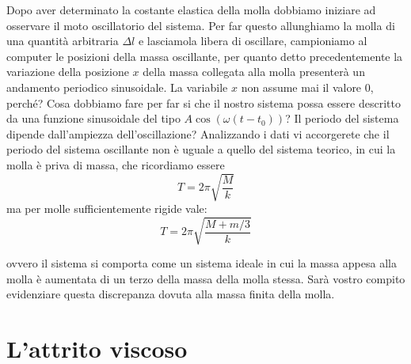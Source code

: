 \documentclass[a4paper,10pt,oneside]{article}
\begin{document}
Dopo aver determinato la costante elastica della molla dobbiamo iniziare ad osservare il moto oscillatorio del sistema. Per far questo allunghiamo la molla di una quantità arbitraria $\Delta l$ e lasciamola libera di oscillare, campioniamo al computer le posizioni della massa oscillante, per quanto detto precedentemente la variazione della posizione $x$ della massa collegata alla molla presenterà un andamento periodico sinusoidale. La variabile $x$ non assume mai il valore $0$, perché?
Cosa dobbiamo fare per far si che il nostro sistema possa essere descritto da una funzione sinusoidale del tipo $A\cos(\omega(t-t_0))$? Il periodo del sistema dipende dall'ampiezza dell'oscillazione?
Analizzando i dati vi accorgerete che il periodo del sistema oscillante non è uguale a quello del sistema teorico, in cui la molla è priva di massa, che ricordiamo essere
\begin{equation}
 T=2\pi\sqrt{\frac{M}{k}}
\end{equation}
ma per molle sufficientemente rigide vale:
\begin{equation}
 T=2\pi\sqrt{\frac{M+m/3}{k}}
\end{equation}

ovvero il sistema si comporta come un sistema ideale in cui la massa appesa alla molla è aumentata di un terzo della massa della molla stessa. Sarà vostro compito evidenziare questa discrepanza dovuta alla massa finita della molla.


\section*{L'attrito viscoso}
\end{document}
